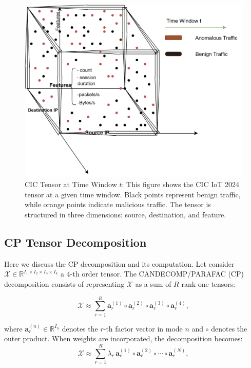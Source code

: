 \documentclass[pdflatex,sn-mathphys-num]{sn-jnl}
\theoremstyle{thmstyleone}
\theoremstyle{thmstyletwo}
\theoremstyle{thmstylethree}
\begin{document}
\begin{figure}[H]
    \centering
    \includegraphics[width=0.8\linewidth]{Sh (1).png}
    \caption{CIC Tensor at Time Window $t$: This figure shows the CIC IoT 2024 tensor at a given time window. Black points represent benign traffic, while orange points indicate malicious traffic. The tensor is structured in three dimensions: source, destination, and feature.}

    \label{fig:tensor_3d}
\end{figure}

\subsection{CP Tensor Decomposition}
Here we discuss the CP decomposition and its computation. 
Let consider $\mathcal{X} \in \mathbb{R}^{I_1 \times I_2 \times I_3 \times I_4}$ a $4$-th order tensor. The CANDECOMP/PARAFAC (CP) decomposition consists of representing $\mathcal{X}$ as a sum of $R$ rank-one tensors:

\begin{equation}
\mathcal{X} \approx \sum_{r=1}^{R} \mathbf{a}_r^{(1)} \circ \mathbf{a}_r^{(2)} \circ \mathbf{a}_r^{(3)} \circ \mathbf{a}_r^{(4)},
\label{eq:cp-basic}
\end{equation}

\noindent where $\mathbf{a}_r^{(n)} \in \mathbb{R}^{I_n}$ denotes the $r$-th factor vector in mode $n$ and $\circ$ denotes the outer product. When weights are incorporated, the decomposition becomes:
\begin{equation}
\mathcal{X} \approx \sum_{r=1}^{R} \lambda_{r} \, \mathbf{a}_r^{(1)} \circ \mathbf{a}_r^{(2)} \circ \cdots \circ \mathbf{a}_r^{(N)},
\label{eq:cp-lambda}
\end{equation}
\end{document}
